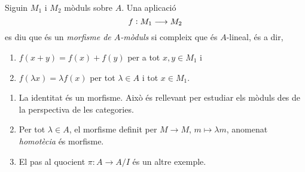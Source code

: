 \documentclass[../../../main.tex]{subfiles}
\begin{document}
\begin{defi}
\label{def:morfismemoduls} Siguin $M_1$ i $M_2$ mòduls sobre $A$. Una aplicació
\begin{equation}
    \notag
    f:M_1\longrightarrow M_2
\end{equation}
es diu que és un \textit{morfisme de $A$-mòduls} si compleix que és $A$-lineal, és a dir, 
\begin{enumerate}[(1)]
    \item$f(x+y) = f(x)+f(y)$ per a tot $x,y\in M_1$ i
    \item $f(\lambda x) = \lambda  f(x)$ per tot $\lambda\in A$ i tot $x\in M_1$.
\end{enumerate}
\end{defi}

\begin{ej}
\begin{enumerate}
    \item La identitat és un morfisme. Això és rellevant per estudiar els mòduls des de la perspectiva de les categories.
    \item Per tot $\lambda\in A$, el morfisme definit per $M\to M$, $m\mapsto\lambda m$, anomenat \textit{homotècia} és morfisme. 
    \item El pas al quocient $\pi:A\to A/I$ és un altre exemple.
\end{enumerate}
\end{ej}
\end{document}

